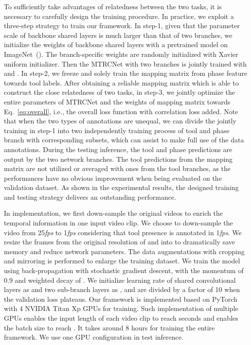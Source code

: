 \documentclass{elsarticle}
\begin{document}
To sufficiently take advantages of relatedness between the two tasks, it is necessary to carefully design the training procedure.
In practice, we exploit a three-step strategy to train our framework.
In step-1, given that the parameter scale of backbone shared layers is much larger than that of two branches,
we initialize the weights of backbone shared layers with a pretrained model on ImageNet~(\cite{he2016deep}).
The branch-specific weights  are randomly initialized with Xavier uniform initializer.
Then the MTRCNet with two branches is jointly trained with  and .
In step-2, we freeze  and solely train the mapping matrix  from phase feature towards tool labels.
After obtaining a reliable mapping matrix which is able to construct the close relatedness of two tasks, in step-3, we jointly optimize the entire parameters of MTRCNet  and the weights of mapping matrix   towards Eq.~\ref{eq:overall}, i.e., the overall loss function   with correlation loss added. 
Note that when the two types of annotations are unequal, we can divide the jointly training in step-1 into two independently training process of tool and phase branch with corresponding subsets, which can assist to make full use of the data annotations.
During the testing inference, the tool and phase predictions are output by the two network branches. 
The tool predictions from the mapping matrix are not utilized or averaged with ones from the tool branches, as the performances have no obvious improvement when being evaluated on the validation dataset.
As shown in the experimental results, the designed training and testing strategy delivers an outstanding performance.


In implementation, we first down-sample the original videos to enrich the temporal information in one input video clip. 
We choose to down-sample the video from 25\emph{fps} to 1\emph{fps} considering that tool presence is annotated in 1\emph{fps}.
We resize the frames from the original resolution of  and  into  to dramatically save memory and reduce network parameters.
The data augmentations with  cropping and mirroring is performed to enlarge the training dataset.
We train the model using back-propagation with stochastic gradient descent, with the momentum of 0.9 and weighted decay of .
We initialize learning rate of shared convolutional layers as  and two sub-branch layers as , and are divided by a factor of 10 when the validation loss plateaus.
Our framework is implemented based on PyTorch with 4 NVIDIA Titan Xp GPUs for training. 
Such implementation of multiple GPUs enables the input length of each video clip to reach  seconds and enables the batch size to reach .
It takes around 8 hours for training the entire framework.
We use one GPU configuration in test inference.
\end{document}
